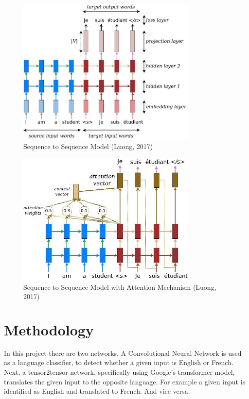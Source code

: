 \documentclass[10pt,a4paper]{article}
\begin{document}
\begin{figure}
  \begin{center}
    \includegraphics[width=0.8\textwidth]{seq2seq.jpg}
    \caption{Sequence to Sequence Model (Luong, 2017)}
  \end{center}
\end{figure}

\begin{figure}
  \begin{center}
    \includegraphics[width=0.8\textwidth] {attention_mechanism.jpg}
    \caption{Sequence to Sequence Model with Attention Mechanism (Luong, 2017)}
  \end{center}
\end{figure}

\section{Methodology}

  In this project there are two networks. A Convolutional Neural Network is used as a language classifier, to detect whether a given input is English or French. Next, a tensor2tensor network, specifically using Google's transformer model, translates the given input to the opposite language. For example a given input is identified as English and translated to French. And vice versa.
  
\end{document}
